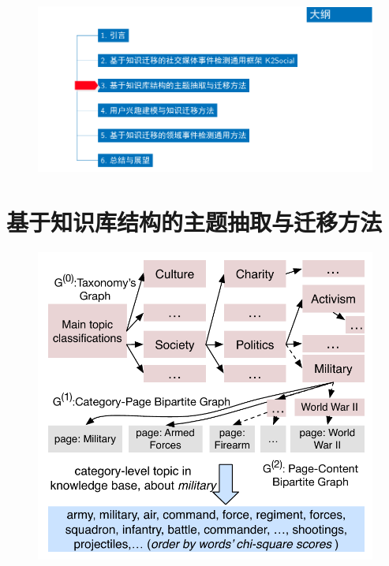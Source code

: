\begin{withoutheadline}
\begin{frame}
\vspace*{-13mm}
\begin{figure}
	\hspace*{-4.2mm}
    \includegraphics[width=1.0\paperwidth]{img/contents3_output.pdf}
\end{figure}

\end{frame}
\end{withoutheadline}

\section{基于知识库结构的主题抽取与迁移方法}
\begin{frame}
\begin{figure}[h]
		\setlength{\abovecaptionskip}{0.cm}
        \setlength{\belowcaptionskip}{0.cm}
        \centering
        \includegraphics[width=0.7\columnwidth]{img/initializationExample.pdf}
        \label{fig:hood}
\end{figure}
\end{frame}

